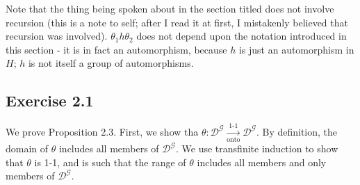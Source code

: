 \documentclass{article}
\theoremstyle{definition}
\begin{document}
Note that the thing being spoken about in the section titled  
does not involve recursion (this is a note to self; after I 
read it at first, I mistakenly believed that recursion was involved). $\theta_1 h\theta_2$ does not depend upon the notation introduced in this 
section - it is in fact an automorphism, because $h$ is just an automorphism in $H$; $h$ is not itself a group of automorphisms.

\subsection*{Exercise 2.1}
We prove Proposition 2.3. First, we show tha
$\theta:\mathcal{D}^\mathcal{G}\xrightarrow[\textrm{onto}]{\text{1-1}}\mathcal{D}^\mathcal{G}$.
By definition, the domain of $\theta$ includes all members of $\mathcal{D}^\mathcal{G}$. We use transfinite induction 
to show that $\theta$ is 1-1, and is such that the range of $\theta$ includes all members and only members of $\mathcal{D}^\mathcal{G}$.
\end{document}
